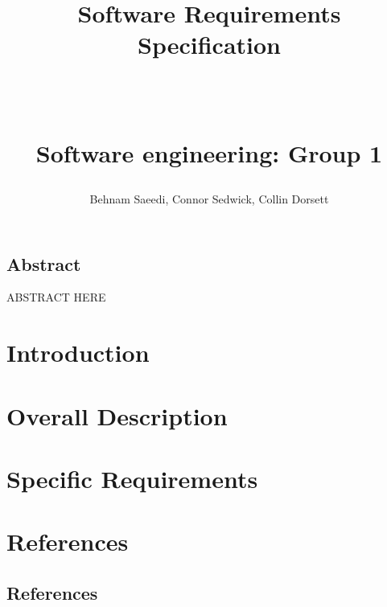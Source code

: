 \documentclass[11pt,a4paper]{book}
\title{
	\vspace{8mm}
	\begin{Huge} Software Requirements Specification \end{Huge}\\
	\vspace{3mm}
	\begin{huge} Software engineering: Group 1
	\end{huge}
	\vspace{5mm}
}
\author{Behnam Saeedi, Connor Sedwick, Collin Dorsett}
\begin{document}

\vspace{16mm}



\section*{Abstract}
ABSTRACT HERE
\newpage
\tableofcontents

\chapter{Introduction}



\newpage

\chapter{Overall Description}



\newpage

\chapter{Specific Requirements}



\newpage
\chapter{References}

\newpage
\section{References}

\end{document}
